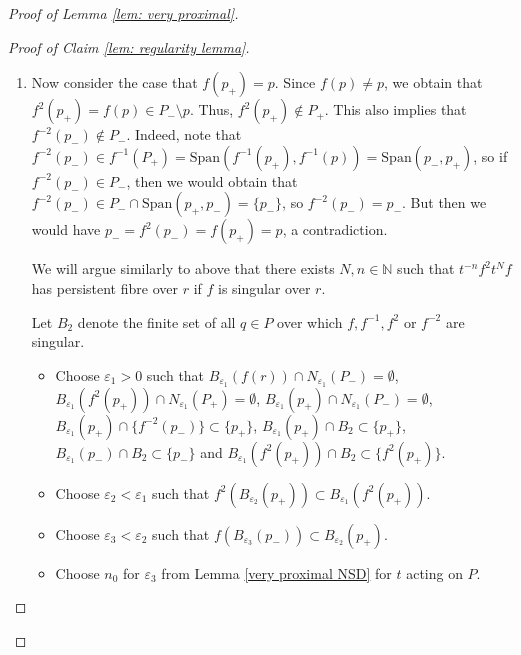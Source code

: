 \documentclass[12pt]{article}
\theoremstyle{definition}
\newcommand{\N}{\mathbb{N}}
\newcommand{\Span}{\mathrm{Span}}
\newcommand{\ve}{\varepsilon}
\begin{document}
\begin{proof} [Proof of Lemma \ref{lem: very proximal}]
\begin{proof}[Proof of Claim \ref{lem: regularity lemma}]
\begin{enumerate}
\begin{enumerate}
\begin{enumerate}
    Therefore, $t^{-n} f t^n f$ has persistent fibre over $r$, contradicting that it fixes a point of $X$. We conclude that $f$ is biregular over $r$.
    
    
    

    \item Now consider the case that $f(p_+) = p$. Since $f(p) \neq p$, we obtain that $f^2(p_+) = f(p) \in P_- \setminus p$. Thus, $f^2(p_+) \notin P_+$. This also implies that $f^{-2}(p_-) \notin P_-$. Indeed, note that $f^{-2}(p_-) \in f^{-1}(P_+) = \Span(f^{-1}(p_+), f^{-1}(p)) = \Span(p_-, p_+)$, so if $f^{-2}(p_-) \in P_-$, then we would obtain that $f^{-2}(p_-) \in P_- \cap \Span(p_+, p_-) = \{p_-\}$, so $f^{-2}(p_-) = p_-$. But then we would have $p_- = f^{2}(p_-) = f(p_+) = p$, a contradiction. 

    We will argue similarly to above that there exists $N,n \in \N$ such that $t^{-n}f^2 t^N f$ has persistent fibre over $r$ if $f$ is singular over $r$. 

    Let $B_2$ denote the finite set of all $q \in P$ over which $f, f^{-1}, f^2$ or $f^{-2}$ are singular. 


    \begin{itemize}
        \item Choose $\ve_1 > 0$ such that $B_{\ve_1}(f(r)) \cap N_{\ve_1}(P_-) = \emptyset$, $B_{\ve_1}(f^2(p_+)) \cap N_{\ve_1}(P_+) = \emptyset$, $B_{\ve_1}(p_+) \cap N_{\ve_1}(P_-) = \emptyset$, $B_{\ve_1}(p_+) \cap \{f^{-2}(p_-)\} \subset \{p_+\}$, $B_{\ve_1}(p_+) \cap B_2 \subset \{p_+\}$, $B_{\ve_1}(p_-) \cap B_2 \subset \{p_-\}$ and $B_{\ve_1}(f^2(p_+)) \cap B_2 \subset \{f^2(p_+)\}$.
        \item Choose $\ve_2 < \ve_1$ such that $f^2(B_{\ve_2}(p_+)) \subset B_{\ve_1}(f^2(p_+))$.
        \item Choose $\ve_3 < \ve_2$ such that $f(B_{\ve_3}(p_-)) \subset B_{\ve_2}(p_+)$.
        \item Choose $n_0$ for $\ve_3$ from Lemma \ref{very proximal NSD} for $t$ acting on $P$. 
    \end{itemize}

    
    

\end{enumerate}
\end{enumerate}
\end{enumerate}
\end{proof}
\end{proof}
\end{document}
